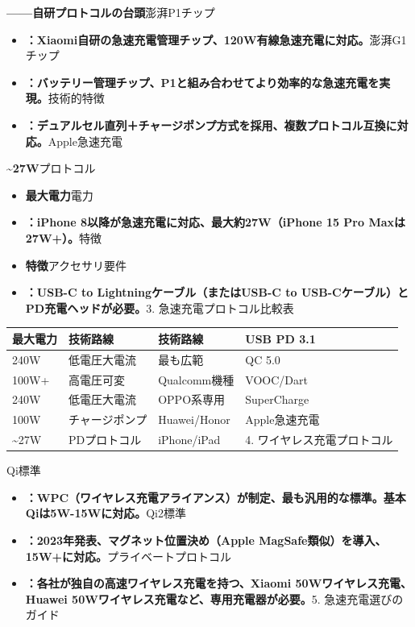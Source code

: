 \textbf{——自研プロトコルの台頭}澎湃P1チップ

\begin{itemize}
  \item \textbf{：Xiaomi自研の急速充電管理チップ、120W有線急速充電に対応。}澎湃G1チップ
  \item \textbf{：バッテリー管理チップ、P1と組み合わせてより効率的な急速充電を実現。}技術的特徴
  \item \textbf{：デュアルセル直列＋チャージポンプ方式を採用、複数プロトコル互換に対応。}Apple急速充電
\end{itemize}

\textbf{\textasciitilde{}27W}プロトコル

\begin{itemize}
  \item \textbf{最大電力}電力
  \item \textbf{：iPhone 8以降が急速充電に対応、最大約27W（iPhone 15 Pro Maxは27W+）。}特徴
  \item \textbf{特徴}アクセサリ要件
  \item \textbf{：USB-C to Lightningケーブル（またはUSB-C to USB-Cケーブル）とPD充電ヘッドが必要。}3. 急速充電プロトコル比較表
\end{itemize}


\begin{center}
\begin{tabularx}{\linewidth}{|X|X|X|X|}
\hline
\textbf{最大電力} & \textbf{技術路線} & \textbf{技術路線} & \textbf{USB PD 3.1} \tabularnewline
\hline
240W & 低電圧大電流 & 最も広範 & QC 5.0 \tabularnewline
100W+ & 高電圧可変 & Qualcomm機種 & VOOC/Dart \tabularnewline
240W & 低電圧大電流 & OPPO系専用 & SuperCharge \tabularnewline
100W & チャージポンプ & Huawei/Honor & Apple急速充電 \tabularnewline
\textasciitilde{}27W & PDプロトコル & iPhone/iPad & 4. ワイヤレス充電プロトコル \tabularnewline
\hline
\end{tabularx}
\end{center}


Qi標準

\begin{itemize}
  \item \textbf{：WPC（ワイヤレス充電アライアンス）が制定、最も汎用的な標準。基本Qiは5W-15Wに対応。}Qi2標準
  \item \textbf{：2023年発表、マグネット位置決め（Apple MagSafe類似）を導入、15W+に対応。}プライベートプロトコル
  \item \textbf{：各社が独自の高速ワイヤレス充電を持つ、Xiaomi 50Wワイヤレス充電、Huawei 50Wワイヤレス充電など、専用充電器が必要。}5. 急速充電選びのガイド
\end{itemize}

